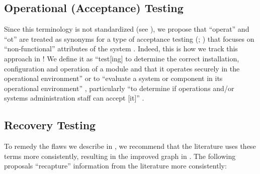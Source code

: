     \subsection{Operational (Acceptance) Testing}\label{oat-test-rec}
    Since this terminology is not standardized (see ), we
    propose that ``\acf{operat}'' and ``\acf{ot}'' are treated as
    synonyms for a type of acceptance testing (\citealp[p.~22]{IEEE2022};
    \citealpISTQB{}) that focuses on ``non-functional'' attributes of the system
    \citep{LambdaTest2024}. Indeed, this is how we
    track this approach in \ourApproachGlossary{}! We define it as ``test[ing] to
    determine the correct installation, configuration and operation of a module and
    that it operates securely in the operational environment'' \citep{ISO_IEC2018}
    or to ``evaluate a system or component in its operational environment''
    \citep[p.~303]{IEEE2017}, particularly ``to determine if operations and/or
    systems administration staff can accept [it]'' \citepISTQB{}.
\fi

\subsection{Recovery Testing}\label{rec-test-rec}

To remedy the flaws we describe in , we recommend that the
literature uses these terms more consistently, resulting in the improved graph
in . The following proposals ``recapture''
information from the literature more consistently:

